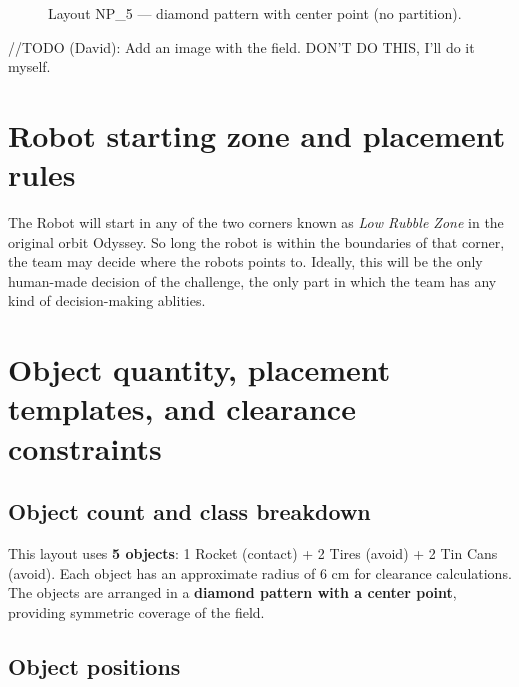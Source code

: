 \documentclass[a4]{article}
\begin{document}
\begin{figure}[H]
\caption{Layout NP\_5 --- diamond pattern with center point (no partition).}
\end{figure}

//TODO (David): Add an image with the field. DON'T DO THIS, I'll do it myself.

\section*{Robot starting zone and placement rules}
The Robot will start in any of the two corners known as \textit{Low Rubble Zone} in the original orbit Odyssey. So long the robot is within the boundaries of that corner, the team may decide where the robots points to. Ideally, this will be the only human-made decision of the challenge, the only part in which the team has any kind of decision-making ablities. 

\section*{Object quantity, placement templates, and clearance constraints}
\subsection*{Object count and class breakdown}
This layout uses \textbf{5 objects}: 1 Rocket (contact) + 2 Tires (avoid) + 2 Tin Cans (avoid). Each object has an approximate radius of 6 cm for clearance calculations. The objects are arranged in a \textbf{diamond pattern with a center point}, providing symmetric coverage of the field.

\subsection*{Object positions}
\end{document}
